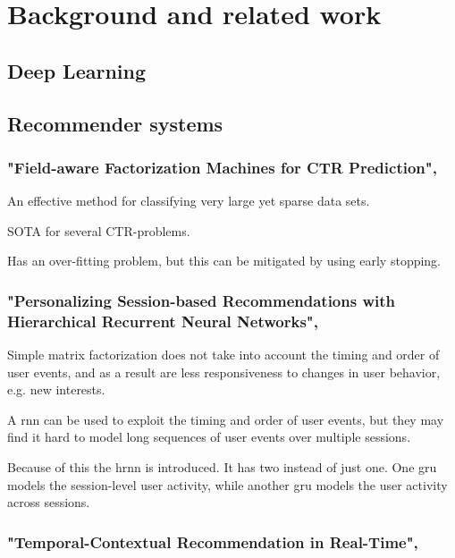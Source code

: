 \chapter{Background and related work}
\label{chap:background}

\section{Deep Learning}

\section{Recommender systems}

\subsection{"Field-aware Factorization Machines for CTR Prediction", \citeyear{ffmctr} \cite{ffmctr}}

An effective method for classifying very large yet sparse data sets.

SOTA for several CTR-problems.

Has an over-fitting problem, but this can be mitigated by using early stopping.

\subsection{"Personalizing Session-based Recommendations with Hierarchical Recurrent Neural Networks", \citeyear{QuadranaKHC17} \cite{QuadranaKHC17}}

Simple matrix factorization does not take into account the timing and order of user events, and as a result are less responsiveness to changes in user behavior, e.g. new interests.

A \acrfull{rnn} can be used to exploit the timing and order of user events, but they may find it hard to model long sequences of user events over multiple sessions.

Because of this the \acrfull{hrnn} is introduced. It has two  instead of just one. One \acrshort{gru} models the session-level user activity, while another \acrshort{gru} models the user activity across sessions.

\subsection{"Temporal-Contextual Recommendation in Real-Time", \citeyear{tempcon} \cite{tempcon}}

